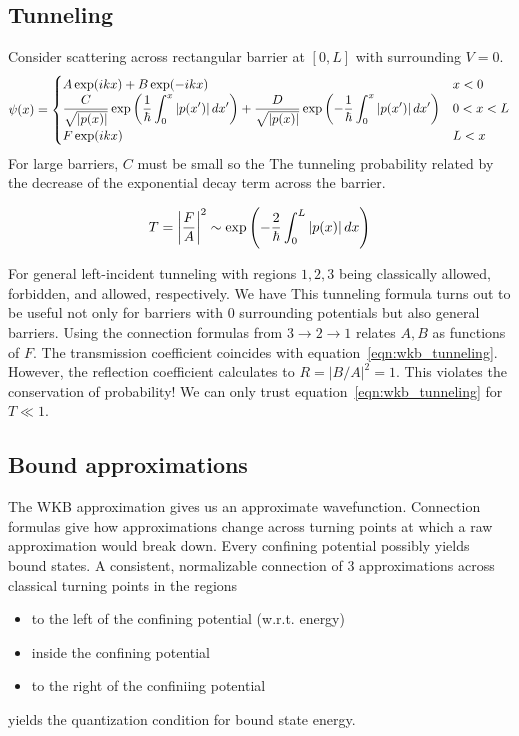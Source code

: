 \subsection{Tunneling}
Consider scattering across rectangular barrier at $[0, L]$ with surrounding $V=0$. 
\[
    \psi(x) = \begin{cases}
        A\exp(ikx) + B\exp(-ikx) & x<0 \\ 
        \displaystyle 
        \dfrac C {\sqrt{|p(x)|}}\exp\left(\dfrac 1 {\hbar} \int_0^x |p(x')|\, dx'\right) + 
        \dfrac D {\sqrt{|p(x)|}}\exp\left(-\dfrac 1 {\hbar} \int_0^x |p(x')|\, dx'\right) & 0<x<L \\ 
        F\exp(ikx) & L<x
\end{cases}\] 
For large barriers, $C$ must be small so the The tunneling probability related 
by the decrease of the exponential decay term across the barrier. 
\begin{mdframed}
    \begin{equation}
        \label{eqn:wkb_tunneling}
        T = \left|\dfrac F A\right|^2 \sim \exp\left(-\dfrac 2 {\hbar} \int_0^L |p(x)|\, dx\right)
    \end{equation}
\end{mdframed}
For general left-incident tunneling with regions $1, 2, 3$ 
being classically allowed, forbidden, and allowed, respectively. 
We have 
This tunneling formula turns out to be useful not only for barriers with $0$ 
surrounding potentials but also general barriers. 
Using the connection formulas from $3\to 2\to 1$ relates 
$A, B$ as functions of $F$. The transmission coefficient coincides 
with equation~\ref{eqn:wkb_tunneling}. 
However, the reflection coefficient calculates to $R=|B/A|^2=1$. 
This violates the conservation of probability! 
We can only trust equation~\ref{eqn:wkb_tunneling} for $T\ll 1$. 

\subsection{Bound approximations}
The WKB approximation gives us an approximate wavefunction. 
Connection formulas give how approximations change across turning points 
at which a raw approximation would break down. 
Every confining potential possibly yields bound states. 
A consistent, normalizable connection of 3 approximations across 
classical turning points in the regions 
\begin{itemize}
    \item to the left of the confining potential (w.r.t. energy)
    \item inside the confining potential
    \item to the right of the confiniing potential 
\end{itemize}
yields the quantization condition for bound state energy. 

